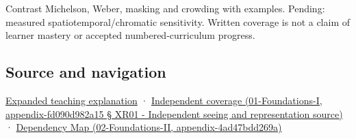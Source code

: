 Contrast Michelson, Weber, masking and crowding with examples. Pending: measured spatiotemporal/chromatic sensitivity. Written coverage is not a claim of learner mastery or accepted numbered-curriculum progress.

\subsection{Source and navigation}\label{source-and-navigation}

\href{Continuous\%20Notes/University\%20-\%20Worlds,\%20Images\%20and\%20Inference\%20-\%20Graphics,\%20Vision\%20and\%20Photography\#Visibility\%20is\%20about\%20contrast,\%20conditions\%20and\%20tasks}{Expanded teaching explanation} · \href{}{Independent coverage (01-Foundations-I, appendix-fd090d982a15 § XR01 - Independent seeing and representation source)} · \href{}{Dependency Map (02-Foundations-II, appendix-4ad47bdd269a)}
